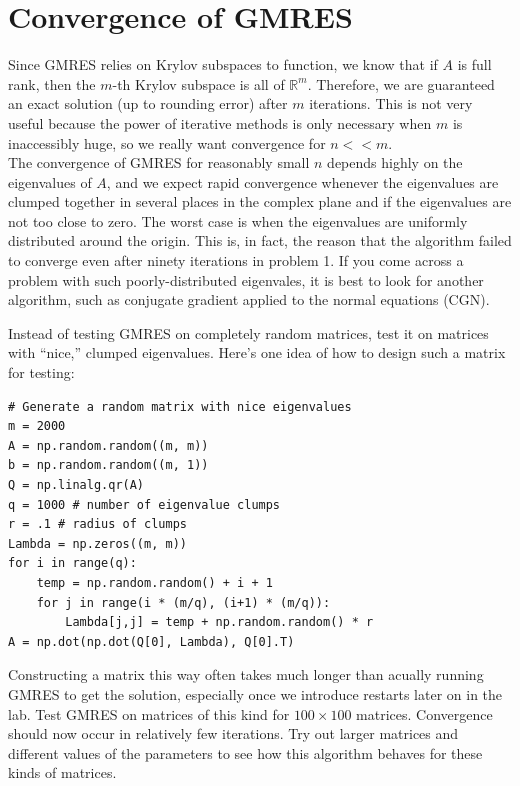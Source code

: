 \section*{Convergence of GMRES}
Since GMRES relies on Krylov subspaces to function, we know that if $A$ is full rank, then the $m$-th Krylov subspace is all of $\mathbb{R}^m$.
Therefore, we are guaranteed an exact solution (up to rounding error) after $m$ iterations.
This is not very useful because the power of iterative methods is only necessary when $m$ is inaccessibly huge, so we really want convergence for $n<<m$.\\
\indent The convergence of GMRES for reasonably small $n$ depends highly on the eigenvalues of $A$, and we expect rapid convergence whenever the eigenvalues are clumped together in several places in the complex plane and if the eigenvalues are not too close to zero.
The worst case is when the eigenvalues are uniformly distributed around the origin.
This is, in fact, the reason that the algorithm failed to converge even after ninety iterations in problem 1.
If you come across a problem with such poorly-distributed eigenvales, it is best to look for another algorithm, such as conjugate gradient applied to the normal equations (CGN).

\begin{problem}
\label{prob:GMRESClumps}
Instead of testing GMRES on completely random matrices, test it on matrices with ``nice,'' clumped eigenvalues.
Here's one idea of how to design such a matrix for testing:\\
\begin{lstlisting}
# Generate a random matrix with nice eigenvalues
m = 2000
A = np.random.random((m, m))
b = np.random.random((m, 1))
Q = np.linalg.qr(A)
q = 1000 # number of eigenvalue clumps
r = .1 # radius of clumps
Lambda = np.zeros((m, m))
for i in range(q):
    temp = np.random.random() + i + 1
    for j in range(i * (m/q), (i+1) * (m/q)):
        Lambda[j,j] = temp + np.random.random() * r
A = np.dot(np.dot(Q[0], Lambda), Q[0].T)
\end{lstlisting}
Constructing a matrix this way often takes much longer than acually running GMRES to get the solution, especially once we introduce restarts later on in the lab.
Test GMRES on matrices of this kind for $100\times 100$ matrices.
Convergence should now occur in relatively few iterations.
Try out larger matrices and different values of the parameters to see how this algorithm behaves for these kinds of matrices.
\end{problem}

